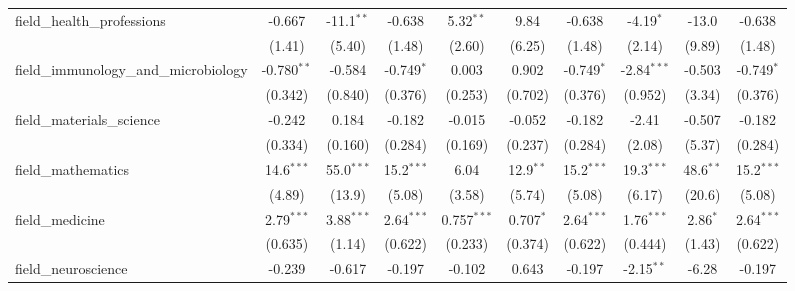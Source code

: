 \begin{tabular}{lccccccccc}
   field\_health\_professions                                  & -0.667         & -11.1$^{**}$   & -0.638         & 5.32$^{**}$    & 9.84          & -0.638         & -4.19$^{*}$    & -13.0         & -0.638\\   
                                                               & (1.41)         & (5.40)         & (1.48)         & (2.60)         & (6.25)        & (1.48)         & (2.14)         & (9.89)        & (1.48)\\   
   field\_immunology\_and\_microbiology                        & -0.780$^{**}$  & -0.584         & -0.749$^{*}$   & 0.003          & 0.902         & -0.749$^{*}$   & -2.84$^{***}$  & -0.503        & -0.749$^{*}$\\   
                                                               & (0.342)        & (0.840)        & (0.376)        & (0.253)        & (0.702)       & (0.376)        & (0.952)        & (3.34)        & (0.376)\\   
   field\_materials\_science                                   & -0.242         & 0.184          & -0.182         & -0.015         & -0.052        & -0.182         & -2.41          & -0.507        & -0.182\\   
                                                               & (0.334)        & (0.160)        & (0.284)        & (0.169)        & (0.237)       & (0.284)        & (2.08)         & (5.37)        & (0.284)\\   
   field\_mathematics                                          & 14.6$^{***}$   & 55.0$^{***}$   & 15.2$^{***}$   & 6.04           & 12.9$^{**}$   & 15.2$^{***}$   & 19.3$^{***}$   & 48.6$^{**}$   & 15.2$^{***}$\\   
                                                               & (4.89)         & (13.9)         & (5.08)         & (3.58)         & (5.74)        & (5.08)         & (6.17)         & (20.6)        & (5.08)\\   
   field\_medicine                                             & 2.79$^{***}$   & 3.88$^{***}$   & 2.64$^{***}$   & 0.757$^{***}$  & 0.707$^{*}$   & 2.64$^{***}$   & 1.76$^{***}$   & 2.86$^{*}$    & 2.64$^{***}$\\   
                                                               & (0.635)        & (1.14)         & (0.622)        & (0.233)        & (0.374)       & (0.622)        & (0.444)        & (1.43)        & (0.622)\\   
   field\_neuroscience                                         & -0.239         & -0.617         & -0.197         & -0.102         & 0.643         & -0.197         & -2.15$^{**}$   & -6.28         & -0.197\\   

\end{tabular}
